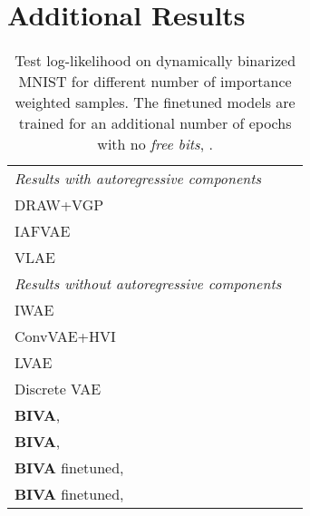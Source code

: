\documentclass{article}
\def\nm{BIVA\xspace}
\def\abovestrut#1{\rule[0in]{0in}{#1}\ignorespaces}
\def\abovespace{\abovestrut{0.20in}}
\begin{document}
\newpage
\section{Additional Results}\label{app:additional_results}





\begin{table}[h!]
\begin{center}
\begin{small}
\begin{sc}
\caption{Test log-likelihood on dynamically binarized MNIST for different number of importance weighted samples. The finetuned models are trained for an additional number of epochs with no \textit{free bits}, .}\label{table:dyn_mnist}
\begin{tabular}{l c}
 &  \\
\hline
 \textit{Results with autoregressive components} \\
 DRAW+VGP \cite{Tran2016} &  \\
 IAFVAE \cite{Kingma2016} & \\
 VLAE \cite{Chen2017} & \\
 \hline
 \textit{Results without autoregressive components} \\
IWAE \cite{Burda15} & \\
 ConvVAE+HVI \cite{Salimans15} &  \\
 LVAE \cite{Sonderby2016} &  \\
 Discrete VAE \cite{Rolfe2017} &  \\
 \abovespace
\textbf{\nm},  &  \\
\textbf{\nm},  &  \\
\textbf{\nm} finetuned,  &  \\
\textbf{\nm} finetuned,  &  \\
\hline
\end{tabular}\end{sc}
\end{small}
\end{center}
\end{table}
\end{document}
